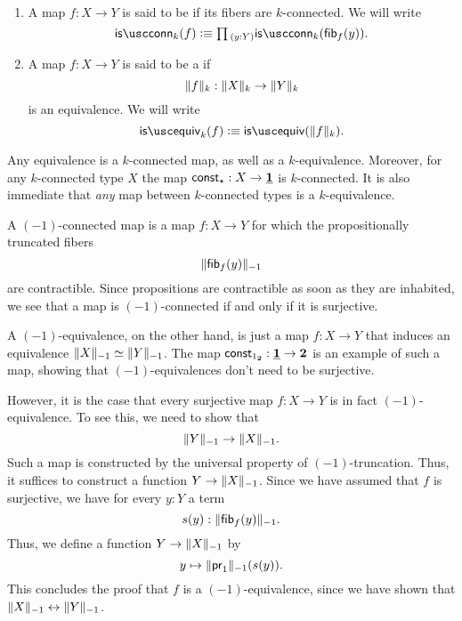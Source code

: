 \begin{defn}
  ~
  \begin{enumerate}
  \item A map $f:X\to Y$ is said to be  if its fibers are $k$-connected. We will write
  \begin{equation*}
    \isconn_k(f)\defeq\prd{y:Y}\isconn_k(\fib{f}{y}).
  \end{equation*}
  \item A map $f:X\to Y$ is said to be a  if
    \begin{equation*}
      \trunc{k}{f}:\trunc{k}{X}\to\trunc{k}{Y}
    \end{equation*}
    is an equivalence. We will write
    \begin{equation*}
      \isequiv_k(f)\defeq\isequiv(\trunc{k}{f}).
    \end{equation*}
  \end{enumerate}
\end{defn}

\begin{eg}
  Any equivalence is a $k$-connected map, as well as a $k$-equivalence. Moreover, for any $k$-connected type $X$ the map $\const_\ttt:X\to\unit$ is $k$-connected. It is also immediate that \emph{any} map between $k$-connected types is a $k$-equivalence.
\end{eg}

\begin{eg}
  A $(-1)$-connected map is a map $f:X\to Y$ for which the propositionally truncated fibers
  \begin{equation*}
    \trunc{-1}{\fib{f}{y}}
  \end{equation*}
  are contractible. Since propositions are contractible as soon as they are inhabited, we see that a map is $(-1)$-connected if and only if it is surjective.

  A $(-1)$-equivalence, on the other hand, is just a map $f:X\to Y$ that induces an equivalence $\trunc{-1}{X}\simeq\trunc{-1}{Y}$. The map $\const_\btrue : \unit\to\bool$ is an example of such a map, showing that $(-1)$-equivalences don't need to be surjective.

  However, it is the case that every surjective map $f:X\to Y$ is in fact $(-1)$-equivalence. To see this, we need to show that
  \begin{equation*}
    \trunc{-1}{Y}\to\trunc{-1}{X}.
  \end{equation*}
  Such a map is constructed by the universal property of $(-1)$-truncation. Thus, it suffices to construct a function $Y\to\trunc{-1}{X}$. Since we have assumed that $f$ is surjective, we have for every $y:Y$ a term
  \begin{equation*}
    s(y):\trunc{-1}{\fib{f}{y}}.
  \end{equation*}
  Thus, we define a function $Y\to\trunc{-1}{X}$ by
  \begin{equation*}
    y\mapsto\trunc{-1}{\proj 1}(s(y)).
  \end{equation*}
  This concludes the proof that $f$ is a $(-1)$-equivalence, since we have shown that $\trunc{-1}{X}\leftrightarrow\trunc{-1}{Y}$. 
\end{eg}


